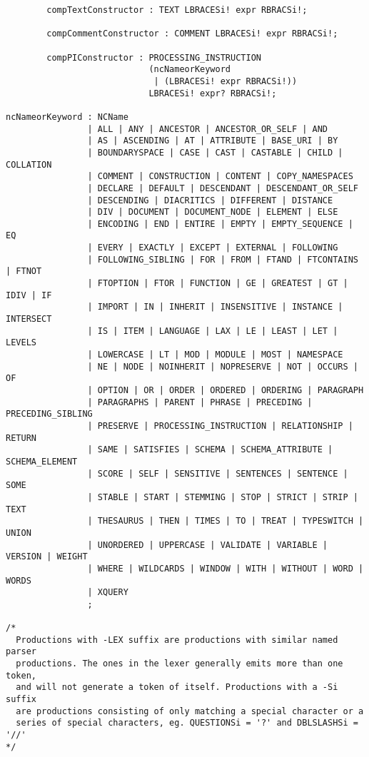 \begin{verbatim}
        compTextConstructor : TEXT LBRACESi! expr RBRACSi!;
        
        compCommentConstructor : COMMENT LBRACESi! expr RBRACSi!;
        
        compPIConstructor : PROCESSING_INSTRUCTION 
                            (ncNameorKeyword 
                             | (LBRACESi! expr RBRACSi!)) 
                            LBRACESi! expr? RBRACSi!;

ncNameorKeyword : NCName
                | ALL | ANY | ANCESTOR | ANCESTOR_OR_SELF | AND
                | AS | ASCENDING | AT | ATTRIBUTE | BASE_URI | BY
                | BOUNDARYSPACE | CASE | CAST | CASTABLE | CHILD | COLLATION
                | COMMENT | CONSTRUCTION | CONTENT | COPY_NAMESPACES
                | DECLARE | DEFAULT | DESCENDANT | DESCENDANT_OR_SELF
                | DESCENDING | DIACRITICS | DIFFERENT | DISTANCE
                | DIV | DOCUMENT | DOCUMENT_NODE | ELEMENT | ELSE
                | ENCODING | END | ENTIRE | EMPTY | EMPTY_SEQUENCE | EQ
                | EVERY | EXACTLY | EXCEPT | EXTERNAL | FOLLOWING
                | FOLLOWING_SIBLING | FOR | FROM | FTAND | FTCONTAINS | FTNOT
                | FTOPTION | FTOR | FUNCTION | GE | GREATEST | GT | IDIV | IF
                | IMPORT | IN | INHERIT | INSENSITIVE | INSTANCE | INTERSECT
                | IS | ITEM | LANGUAGE | LAX | LE | LEAST | LET | LEVELS
                | LOWERCASE | LT | MOD | MODULE | MOST | NAMESPACE
                | NE | NODE | NOINHERIT | NOPRESERVE | NOT | OCCURS | OF
                | OPTION | OR | ORDER | ORDERED | ORDERING | PARAGRAPH
                | PARAGRAPHS | PARENT | PHRASE | PRECEDING | PRECEDING_SIBLING
                | PRESERVE | PROCESSING_INSTRUCTION | RELATIONSHIP | RETURN
                | SAME | SATISFIES | SCHEMA | SCHEMA_ATTRIBUTE | SCHEMA_ELEMENT
                | SCORE | SELF | SENSITIVE | SENTENCES | SENTENCE | SOME
                | STABLE | START | STEMMING | STOP | STRICT | STRIP | TEXT
                | THESAURUS | THEN | TIMES | TO | TREAT | TYPESWITCH | UNION
                | UNORDERED | UPPERCASE | VALIDATE | VARIABLE | VERSION | WEIGHT
                | WHERE | WILDCARDS | WINDOW | WITH | WITHOUT | WORD | WORDS
                | XQUERY
                ;

/*
  Productions with -LEX suffix are productions with similar named parser 
  productions. The ones in the lexer generally emits more than one token, 
  and will not generate a token of itself. Productions with a -Si suffix 
  are productions consisting of only matching a special character or a 
  series of special characters, eg. QUESTIONSi = '?' and DBLSLASHSi = '//'
*/


\end{verbatim}
